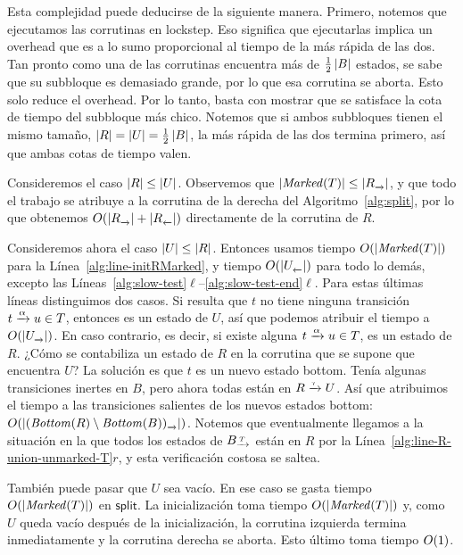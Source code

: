 Esta complejidad puede deducirse de la siguiente manera.
Primero, notemos que ejecutamos las corrutinas en lockstep.
Eso significa que ejecutarlas implica un overhead que es a lo sumo proporcional al tiempo de la más rápida de las dos.
Tan pronto como una de las corrutinas encuentra más de $\frac{1}{2}\left\lvert B \right\rvert$ estados,
se sabe que su subbloque es demasiado grande,
por lo que esa corrutina se aborta.
Esto solo reduce el overhead.
Por lo tanto, basta con mostrar que se satisface la cota de tiempo del subbloque más chico.
Notemos que si ambos subbloques tienen el mismo tamaño, $\left\lvert R \right\rvert = \left\lvert U \right\rvert = \frac{1}{2} \left\lvert B \right\rvert$,
la más rápida de las dos termina primero, así que ambas cotas de tiempo valen.

Consideremos el caso $\left\lvert R \right\rvert \leq \left\lvert U \right\rvert$.
Observemos que $\size{\Marked(T)} \leq \size{R_{\pijl{}}}$, y que todo el trabajo se atribuye a la corrutina de la derecha del Algoritmo~\ref{alg:split},
por lo que obtenemos $\bigo{\size{R_{\pijl{}}} + \size{R_{\lijp{}}}}$ directamente de la corrutina de $R$.

Consideremos ahora el caso $\left\lvert U \right\rvert \leq \left\lvert R \right\rvert$.
Entonces usamos tiempo ${O\!\left(\left\lvert \mathit{Marked}(T) \right\rvert\right)}$ para la Línea~\ref{alg:line-initRMarked},
y tiempo $\bigo{\size{U_{\lijp{}}}}$ para todo lo demás, excepto las Líneas~\ref{alg:slow-test}$\ell$--\ref{alg:slow-test-end}$\ell$.
Para estas últimas líneas
distinguimos dos casos.
Si resulta que $t$ no tiene ninguna transición $t \pijl{\alpha} u \in T$,
entonces es un estado de $U$, así que podemos atribuir el tiempo a $\bigo{\size{U_{\pijl{}}}}$.
En caso contrario, es decir, si existe alguna $t \pijl{\alpha} u \in T$,
es un estado de $R$.
¿Cómo se contabiliza un estado de $R$ en la corrutina que se supone que encuentra $U$?
La solución es que $t$ es un nuevo estado bottom.
Tenía algunas transiciones inertes en $B$,
pero ahora todas están en $R \pijl{\tau} U$.
Así que atribuimos el tiempo a las transiciones salientes de los nuevos estados bottom:
$\bigo{\size{(\Bottom(R) \setminus \Bottom(B))_{\pijl{}}}}$.
Notemos que eventualmente llegamos a la situación en la que todos los estados de $\BT$ están en $R$ por la Línea~\ref{alg:line-R-union-unmarked-T}$r$,
y esta verificación costosa se saltea.

También puede pasar que $U$ sea vacío. En ese caso se gasta tiempo ${O\!\left(\left\lvert \mathit{Marked}(T) \right\rvert\right)}$ en $\mathsf{split}$. La inicialización toma tiempo ${O\!\left(\left\lvert \mathit{Marked}(T) \right\rvert\right)}$ y, como $U$ queda vacío después de la inicialización, la corrutina izquierda termina inmediatamente y la corrutina derecha se aborta. Esto último toma tiempo ${O\!\left(1\right)}$.

